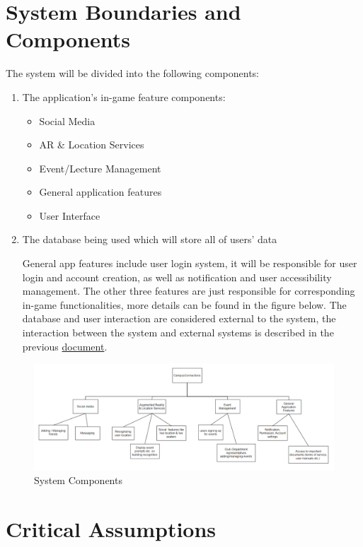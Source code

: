 \documentclass{article}
\begin{document}
\section{System Boundaries and Components}
The system will be divided into the following components:
\begin{enumerate}
	\item The application's in-game feature components:
	      \begin{itemize}
		      \item Social Media
		      \item AR \& Location Services
		      \item Event/Lecture Management
		      \item General application features
		      \item User Interface
	      \end{itemize}
	\item The database being used which will store all of users' data
	
\quad General app features include user login system, it will be responsible for user login and account creation, as well as notification and user accessibility management. The other three features are just responsible for corresponding in-game functionalities, more details can be found in the figure below. The database and user interaction are considered external to the system, the interaction between the system and external systems is described in the previous \href{https://github.com/beatlepie/4G06CapstoneProjectTeam2/blob/docs-hazard-analysis/docs/SRS-Volere/SRS.pdf}{document}.
\end{enumerate}
\begin{figure}[H]
\begin{center}
\includegraphics[scale=0.7]{components.png}
\end{center}
\caption{System Components}
\end{figure}
\section{Critical Assumptions}
\end{document}
